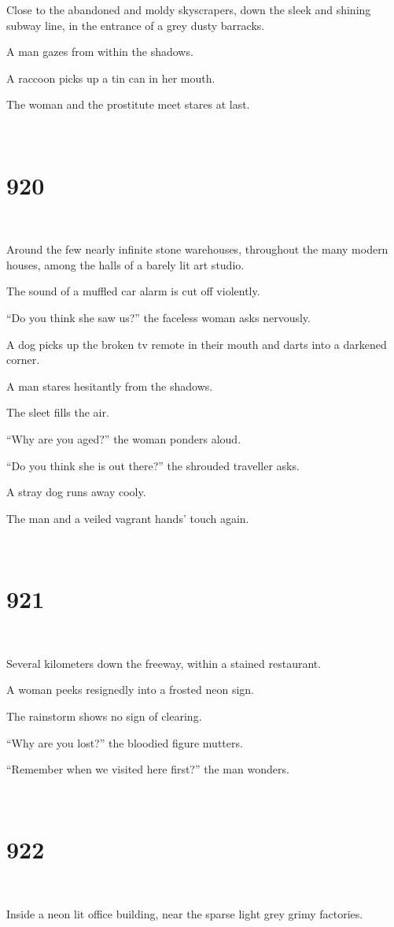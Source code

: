 \documentclass{report}
\begin{document}
Close to the abandoned and moldy skyscrapers, down the sleek and shining subway line, in the entrance of a grey dusty barracks.

A man gazes from within the shadows.

A raccoon picks up a tin can in her mouth.

The woman and the prostitute meet stares at last.

~
\chapter*{920}
~

Around the few nearly infinite stone warehouses, throughout the many modern houses, among the halls of a barely lit art studio.

The sound of a muffled car alarm is cut off violently.

``Do you think she saw us?'' the faceless woman asks nervously.

A dog picks up the broken tv remote in their mouth and darts into a darkened corner.

A man stares hesitantly from the shadows.

The sleet fills the air.

``Why are you aged?'' the woman ponders aloud.

``Do you think she is out there?'' the shrouded traveller asks.

A stray dog runs away cooly.

The man and a veiled vagrant hands' touch again.

~
\chapter*{921}
~

Several kilometers down the freeway, within a stained restaurant.

A woman peeks resignedly into a frosted neon sign.

The rainstorm shows no sign of clearing.

``Why are you lost?'' the bloodied figure mutters.

``Remember when we visited here first?'' the man wonders.

~
\chapter*{922}
~

Inside a neon lit office building, near the sparse light grey grimy factories.
\end{document}
